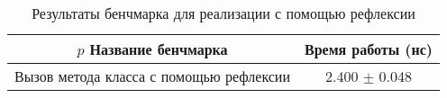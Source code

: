 \begin{table}[h]
\begin{center}
\begin{tabular}{|c|c|} \hline
$p$ Название бенчмарка & Время работы (нс) \\ \hline
Вызов метода класса с помощью рефлексии & 2.400 $\pm$ 0.048\\ \hline
\end{tabular}
\caption{Результаты бенчмарка для реализации с помощью рефлексии}
\label{benchmark:prototype:reflection}
\end{center}
\end{table}
